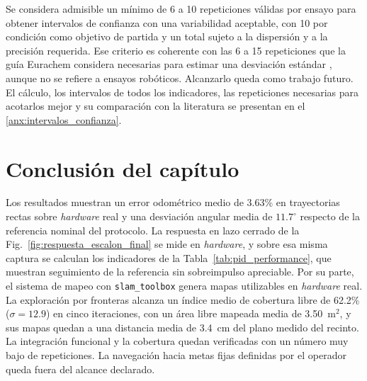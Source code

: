 Se considera admisible un mínimo de 6 a 10 repeticiones válidas por ensayo para
obtener intervalos de confianza con una variabilidad aceptable, con 10 por
condición como objetivo de
partida y un total sujeto a la dispersión y a la precisión requerida. Ese
criterio es coherente con las 6 a 15 repeticiones que la guía Eurachem considera
necesarias para estimar una desviación estándar
\citep[Sec.~5.3.2]{cantwell2025eurachem}, aunque no se refiere a ensayos
robóticos. Alcanzarlo queda como trabajo futuro. El cálculo, los intervalos de todos los indicadores, las
repeticiones necesarias para acotarlos mejor y su comparación con la literatura
se presentan en el \ref{anx:intervalos_confianza}.

\section*{Conclusión del capítulo}
\label{sec:conclusion_resultados}

Los resultados muestran un error odométrico medio de 3.63\% en
trayectorias rectas sobre \textit{hardware} real y una desviación angular media de
$11.7^\circ$ respecto de la referencia nominal del protocolo. La respuesta en lazo cerrado de la Fig.~\ref{fig:respuesta_escalon_final} se
mide en \textit{hardware}, y sobre esa misma captura se calculan los indicadores de
la Tabla~\ref{tab:pid_performance}, que muestran seguimiento de la referencia
sin sobreimpulso apreciable.
Por su parte, el sistema de mapeo con \texttt{slam\_toolbox} genera mapas utilizables en
\textit{hardware} real. La exploración por fronteras alcanza un índice
medio de cobertura libre de 62.2\% ($\sigma=12.9$) en cinco iteraciones, con
un área libre mapeada media de 3.50~m$^2$, y sus mapas quedan a una distancia
media de 3.4~cm del plano medido del recinto. La integración funcional y la
cobertura quedan verificadas con un número muy bajo de repeticiones. La
navegación hacia metas fijas definidas por el operador queda fuera del alcance
declarado.
